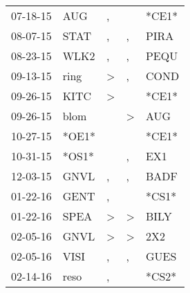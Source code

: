 \begin{supertabular}{p{0.07\textwidth}p{0.06\textwidth}p{0.02\textwidth}p{0.02\textwidth}p{0.06\textwidth}}
          07-18-15\textsuperscript{} &            AUG\textsuperscript{} &                , &                  &                            *CE1* \\
          08-07-15\textsuperscript{} &           STAT\textsuperscript{} &                , &                , &           PIRA\textsuperscript{} \\
          08-23-15\textsuperscript{} &           WLK2\textsuperscript{} &                , &                , &           PEQU\textsuperscript{} \\
          09-13-15\textsuperscript{} &           ring\textsuperscript{} &     \textgreater &                , &           COND\textsuperscript{} \\
          09-26-15\textsuperscript{} &           KITC\textsuperscript{} &     \textgreater &                  &                            *CE1* \\
          09-26-15\textsuperscript{} &           blom\textsuperscript{} &                  &     \textgreater &            AUG\textsuperscript{} \\
          10-27-15\textsuperscript{} &                            *OE1* &                  &                  &                            *CE1* \\
          10-31-15\textsuperscript{} &                            *OS1* &                  &                , &            EX1\textsuperscript{} \\
          12-03-15\textsuperscript{} &           GNVL\textsuperscript{} &                , &                , &           BADF\textsuperscript{} \\
          01-22-16\textsuperscript{} &           GENT\textsuperscript{} &                , &                  &                            *CS1* \\
          01-22-16\textsuperscript{} &           SPEA\textsuperscript{} &     \textgreater &     \textgreater &           BILY\textsuperscript{} \\
          02-05-16\textsuperscript{} &           GNVL\textsuperscript{} &     \textgreater &     \textgreater &            2X2\textsuperscript{} \\
          02-05-16\textsuperscript{} &           VISI\textsuperscript{} &                , &                , &           GUES\textsuperscript{} \\
          02-14-16\textsuperscript{} &           reso\textsuperscript{} &                , &                  &                            *CS2* \\

\end{supertabular}
